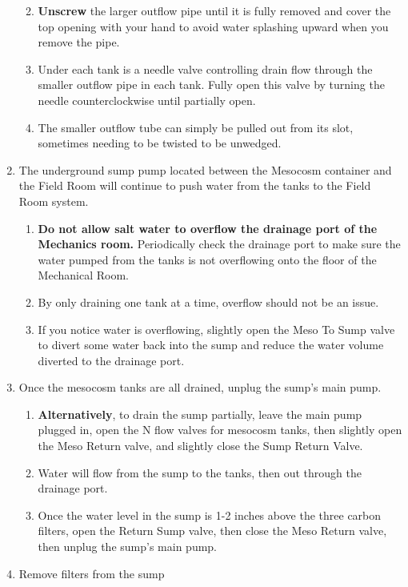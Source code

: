 \documentclass[
]{book}
\providecommand{\tightlist}{%
  \setlength{\itemsep}{0pt}\setlength{\parskip}{0pt}}
\begin{document}
\begin{enumerate}
  \begin{enumerate}
  \def\labelenumii{\arabic{enumii}.}
  \tightlist
  \item
    \textbf{Unscrew} the larger outflow pipe until it is fully removed and cover the top opening with your hand to avoid water splashing upward when you remove the pipe.
  \item
    Under each tank is a needle valve controlling drain flow through the smaller outflow pipe in each tank. Fully open this valve by turning the needle counterclockwise until partially open.
  \item
    The smaller outflow tube can simply be pulled out from its slot, sometimes needing to be twisted to be unwedged.
  \end{enumerate}
\item
  The underground sump pump located between the Mesocosm container and the Field Room will continue to push water from the tanks to the Field Room system.

  \begin{enumerate}
  \def\labelenumii{\arabic{enumii}.}
  \tightlist
  \item
    \textbf{Do not allow salt water to overflow the drainage port of the Mechanics room.} Periodically check the drainage port to make sure the water pumped from the tanks is not overflowing onto the floor of the Mechanical Room.
  \item
    By only draining one tank at a time, overflow should not be an issue.
  \item
    If you notice water is overflowing, slightly open the Meso To Sump valve to divert some water back into the sump and reduce the water volume diverted to the drainage port.
  \end{enumerate}
\item
  Once the mesocosm tanks are all drained, unplug the sump's main pump.

  \begin{enumerate}
  \def\labelenumii{\arabic{enumii}.}
  \tightlist
  \item
    \textbf{Alternatively}, to drain the sump partially, leave the main pump plugged in, open the N flow valves for mesocosm tanks, then slightly open the Meso Return valve, and slightly close the Sump Return Valve.
  \item
    Water will flow from the sump to the tanks, then out through the drainage port.
  \item
    Once the water level in the sump is 1-2 inches above the three carbon filters, open the Return Sump valve, then close the Meso Return valve, then unplug the sump's main pump.
  \end{enumerate}
\item
  Remove filters from the sump


\end{enumerate}
\end{document}
